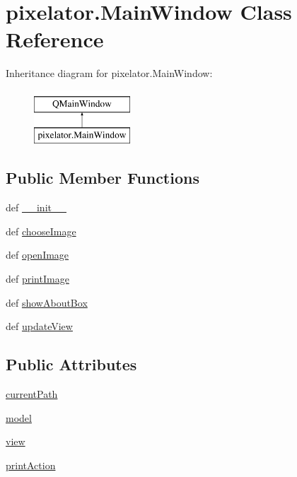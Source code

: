 \hypertarget{classpixelator_1_1MainWindow}{}\section{pixelator.\+Main\+Window Class Reference}
\label{classpixelator_1_1MainWindow}
Inheritance diagram for pixelator.\+Main\+Window\+:\begin{figure}[H]
\begin{center}
\leavevmode
\includegraphics[height=2.000000cm]{classpixelator_1_1MainWindow}
\end{center}
\end{figure}
\subsection*{Public Member Functions}
\begin{DoxyCompactItemize}
\item 
def \hyperlink{classpixelator_1_1MainWindow_a5459bff4038f68dade09f0f1128362a5}{\+\_\+\+\_\+init\+\_\+\+\_\+}
\item 
def \hyperlink{classpixelator_1_1MainWindow_a86308d717a2b5c2e2e97f55a972c0f89}{choose\+Image}
\item 
def \hyperlink{classpixelator_1_1MainWindow_ade47708c76cd36b40203017a69f86848}{open\+Image}
\item 
def \hyperlink{classpixelator_1_1MainWindow_ad77da4fe2051b51444495156135f12e8}{print\+Image}
\item 
def \hyperlink{classpixelator_1_1MainWindow_a3af30c456f7bd9b016fb6ef7b4d5f7f1}{show\+About\+Box}
\item 
def \hyperlink{classpixelator_1_1MainWindow_a4bdcac1e0010936552f6d99737b0aeb4}{update\+View}
\end{DoxyCompactItemize}
\subsection*{Public Attributes}
\begin{DoxyCompactItemize}
\item 
\hyperlink{classpixelator_1_1MainWindow_ad8d8eaa2a04f42b773793203b023a5b3}{current\+Path}
\item 
\hyperlink{classpixelator_1_1MainWindow_a525153be9ef359d2bad5b32c1d893ba5}{model}
\item 
\hyperlink{classpixelator_1_1MainWindow_a54e84915aee591cc6751a35bae271806}{view}
\item 
\hyperlink{classpixelator_1_1MainWindow_a48c84237717e7b691ff9033532e6d7ad}{print\+Action}
\end{DoxyCompactItemize}


